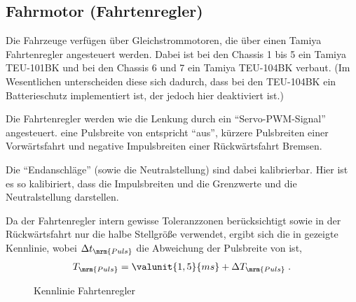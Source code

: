 \subsection{Fahrmotor (Fahrtenregler)}
\label{sec:hw:drivectrl}

Die Fahrzeuge verfügen über Gleichstrommotoren, die über einen Tamiya Fahrtenregler angesteuert werden. Dabei ist bei den Chassis 1 bis 5 ein Tamiya TEU-101BK und bei den Chassis 6 und 7 ein Tamiya TEU-104BK verbaut. (Im Wesentlichen unterscheiden diese sich dadurch, dass bei den TEU-104BK ein Batterieschutz implementiert ist, der jedoch hier deaktiviert ist.)

Die Fahrtenregler werden wie die Lenkung durch ein "`Servo-PWM-Signal"' angesteuert. \Dah eine Pulsbreite von  entspricht "`aus"', kürzere Pulsbreiten einer Vorwärtsfahrt und negative Impulsbreiten einer Rückwärtsfahrt \bzw Bremsen.

Die "`Endanschläge"' (sowie die Neutralstellung) sind dabei kalibrierbar. Hier ist es so kalibiriert, dass die Impulsbreiten  und  die Grenzwerte und  die Neutralstellung darstellen.

Da der Fahrtenregler intern gewisse Toleranzzonen berücksichtigt sowie in der Rückwärtsfahrt nur die halbe Stellgröße verwendet, ergibt sich die in  gezeigte Kennlinie, wobei $\Delta t_\mrm{Puls}$ die Abweichung der Pulsbreite von  ist,
\begin{align*}
	T_\mrm{Puls} = \valunit{1,5}{ms} + \Delta T_\mrm{Puls}\;.
\end{align*}

\begin{figure}[htb]%
	\centering
	
	\caption{Kennlinie Fahrtenregler}%
	\label{fig:DrvCtrl:charact}%
\end{figure}

